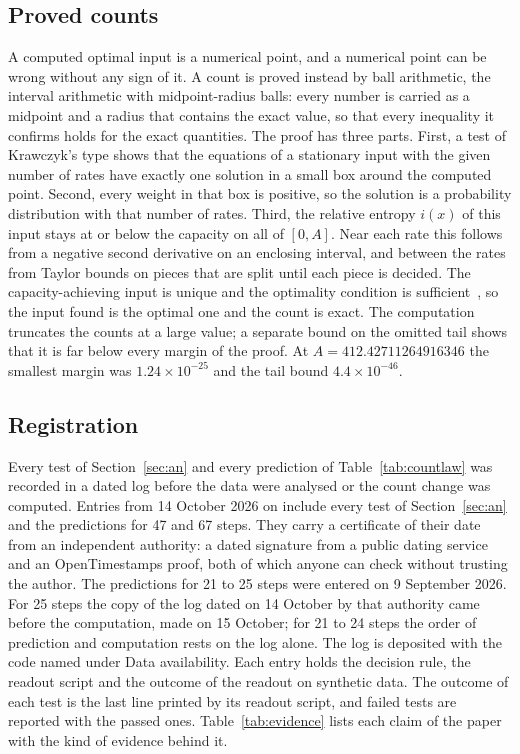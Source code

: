 \documentclass[10pt,letterpaper]{article}
\begin{document}
\subsection{Proved counts}\label{sec:certmeth}
A computed optimal input is a numerical point, and a numerical point can be wrong without any sign of it. A count is proved instead
by ball arithmetic, the interval arithmetic with midpoint-radius balls: every number is carried as a midpoint and a radius
that contains the exact value, so that every
inequality it confirms holds for the exact quantities. The proof has three parts. First, a test of Krawczyk's type shows that the
equations of a stationary input with the given number of rates have exactly one solution in a small box around the computed point.
Second, every weight in that box is positive, so the solution is a probability distribution with that number of rates. Third, the
relative entropy $i(x)$ of this input stays at or below the capacity on all of $[0,A]$. Near each rate this follows from a negative
second derivative on an enclosing interval, and between the rates from Taylor bounds on pieces that are split until each piece is
decided. The capacity-achieving input is unique and the optimality condition is sufficient~\cite{Shamai1990}, so the input found
is the optimal one and the count is exact. The computation truncates the counts at a large value; a separate bound on the omitted
tail shows that it is far below every margin of the proof. At $A=412.42711264916346$ the smallest margin was $1.24\times10^{-25}$
and the tail bound $4.4\times10^{-46}$.

\subsection{Registration}
Every test of Section~\ref{sec:an} and every prediction of Table~\ref{tab:countlaw} was recorded in a dated log before the data were analysed or the count change was
computed. Entries from 14 October 2026 on include every test of Section~\ref{sec:an} and the predictions for 47 and 67 steps. They
carry a certificate of their date from an independent authority: a dated signature from a public dating service and an
OpenTimestamps proof, both of which anyone can check without trusting the author. The predictions for 21 to 25 steps were entered on
9 September 2026. For 25 steps the copy of the log dated on 14 October by that authority came before the computation, made on 15
October; for 21 to 24 steps the
order of prediction and computation rests on the log alone. The log is deposited with the code named under Data availability. Each entry holds the decision rule, the readout script and the outcome of the readout on synthetic data. The outcome of each test is the last line printed by its readout script, and failed tests are reported with the passed ones. Table~\ref{tab:evidence} lists each claim of the paper with the kind of evidence
behind it.
\end{document}
